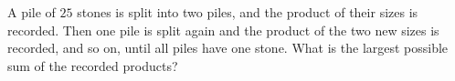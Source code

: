 A pile of $25$ stones is split into two piles, and the product of their sizes is recorded. Then one pile is split again and the product of the two new sizes is recorded, and so on, until all piles have one stone. What is the largest possible sum of the recorded products?
